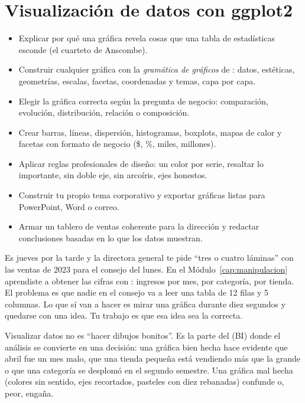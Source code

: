 \chapter{Visualización de datos con ggplot2}
\label{cap:visualizacion}

\begin{objetivos}
\begin{itemize}
  \item Explicar por qué una gráfica revela cosas que una tabla de
        estadísticas esconde (el cuarteto de Anscombe).
  \item Construir cualquier gráfica con la \emph{gramática de gráficos} de
        : datos, estéticas, geometrías, escalas, facetas,
        coordenadas y temas, capa por capa.
  \item Elegir la gráfica correcta según la pregunta de negocio:
        comparación, evolución, distribución, relación o composición.
  \item Crear barras, líneas, dispersión, histogramas, boxplots, mapas de
        calor y facetas con formato de negocio (\$, \%, miles, millones).
  \item Aplicar reglas profesionales de diseño: un color por serie,
        resaltar lo importante, sin doble eje, sin arcoíris, ejes honestos.
  \item Construir tu propio tema corporativo  y
        exportar gráficas listas para PowerPoint, Word o correo.
  \item Armar un tablero de ventas coherente para la dirección y
        redactar conclusiones basadas en lo que los datos muestran.
\end{itemize}
\end{objetivos}

Es jueves por la tarde y la directora general te pide ``tres o cuatro
láminas'' con las ventas de 2023 para el consejo del lunes. En el
Módulo~\ref{cap:manipulacion} aprendiste a obtener las cifras con
: ingresos por mes, por categoría, por tienda. El problema es
que nadie en el consejo va a leer una tabla de 12 filas y 5 columnas. Lo que
sí van a hacer es mirar una gráfica durante diez segundos y quedarse con una
idea. Tu trabajo es que esa idea sea la correcta.

Visualizar datos no es ``hacer dibujos bonitos''. Es la parte del
 (BI) donde el análisis se convierte en una
decisión: una gráfica bien hecha hace evidente que abril fue un mes malo, que
una tienda pequeña está vendiendo más que la grande o que una categoría se
desplomó en el segundo semestre. Una gráfica mal hecha (colores sin sentido,
ejes recortados, pasteles con diez rebanadas) confunde o, peor, engaña.

